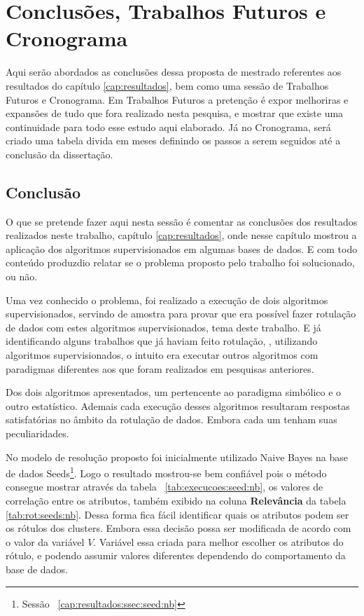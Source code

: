 \chapter{Conclusões, Trabalhos Futuros e Cronograma}\label{cap:conclusao} 
Aqui serão abordados as conclusões dessa  proposta de mestrado referentes aos resultados do capítulo \ref{cap:resultados},  bem como uma sessão de Trabalhos Futuros e  Cronograma. Em Trabalhos Futuros a pretenção é expor melhoriras e expansões de tudo que fora realizado  nesta pesquisa, e mostrar que existe uma continuidade para todo esse estudo aqui elaborado. Já no Cronograma, será criado uma tabela divida em meses definindo os passos a serem seguidos até a conclusão da dissertação.

\section{Conclusão}\label{cond}
O que se pretende fazer aqui nesta sessão é comentar as conclusões dos resultados realizados neste trabalho, capítulo \ref{cap:resultados}, onde nesse capítulo mostrou a aplicação dos algoritmos supervisionados em algumas bases de dados. E com todo conteúdo produzdio relatar se o problema proposto pelo trabalho foi solucionado, ou não.

Uma vez conhecido o problema, foi realizado a execução de dois algoritmos supervisionados, servindo de amostra para provar que era possível fazer rotulação de dados com estes algoritmos supervisionados, tema deste trabalho. E já identificando alguns trabalhos que já haviam feito rotulação, \cite{Lopes}, utilizando algoritmos supervisionados, o intuito era executar outros algoritmos com paradigmas diferentes aos que foram realizados em pesquisas anteriores. 

Dos dois algoritmos apresentados, um pertencente ao paradigma simbólico e o outro estatístico. Ademais cada execução desses algoritmos resultaram respostas satisfatórias no âmbito da rotulação de dados. Embora cada um tenham suas peculiaridades.

No modelo de resolução proposto foi inicialmente utilizado Naive Bayes na base de dados Seeds\footnote{Sessão ~\ref{cap:resultados:ssec:seed:nb}}. Logo o resultado mostrou-se bem confiável pois o método consegue mostrar através da tabela ~\ref{tab:execucoes:seed:nb}, os valores de correlação entre os atributos, também exibido na coluna \textbf{Relevância} da tabela \ref{tab:rot:seeds:nb}. Dessa forma fica fácil identificar quais os atributos podem ser os rótulos dos clusters. Embora essa decisão possa ser modificada de acordo com o valor da variável ${V}$. Variável essa criada para melhor escolher os atributos do rótulo, e podendo assumir valores diferentes dependendo do comportamento da base de dados.

